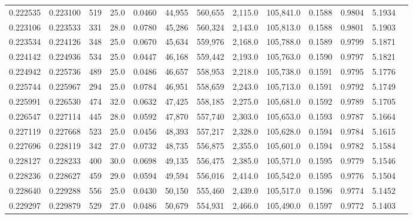 \begin{tabular}{rrrrrrrrrrrrr}
0.222535 & 0.223100 &   519 & 25.0 &                                     0.0460 &  44,955 & 560,655 &   2,115.0 & 105,841.0 & 0.1588 & 0.9804 & 5.1934 \\
0.223106 & 0.223533 &   331 & 28.0 &                                     0.0780 &  45,286 & 560,324 &   2,143.0 & 105,813.0 & 0.1588 & 0.9801 & 5.1903 \\
0.223534 & 0.224126 &   348 & 25.0 &                                     0.0670 &  45,634 & 559,976 &   2,168.0 & 105,788.0 & 0.1589 & 0.9799 & 5.1871 \\
0.224142 & 0.224936 &   534 & 25.0 &                                     0.0447 &  46,168 & 559,442 &   2,193.0 & 105,763.0 & 0.1590 & 0.9797 & 5.1821 \\
0.224942 & 0.225736 &   489 & 25.0 &                                     0.0486 &  46,657 & 558,953 &   2,218.0 & 105,738.0 & 0.1591 & 0.9795 & 5.1776 \\
0.225744 & 0.225967 &   294 & 25.0 &                                     0.0784 &  46,951 & 558,659 &   2,243.0 & 105,713.0 & 0.1591 & 0.9792 & 5.1749 \\
0.225991 & 0.226530 &   474 & 32.0 &                                     0.0632 &  47,425 & 558,185 &   2,275.0 & 105,681.0 & 0.1592 & 0.9789 & 5.1705 \\
0.226547 & 0.227114 &   445 & 28.0 &                                     0.0592 &  47,870 & 557,740 &   2,303.0 & 105,653.0 & 0.1593 & 0.9787 & 5.1664 \\
0.227119 & 0.227668 &   523 & 25.0 &                                     0.0456 &  48,393 & 557,217 &   2,328.0 & 105,628.0 & 0.1594 & 0.9784 & 5.1615 \\
0.227696 & 0.228119 &   342 & 27.0 &                                     0.0732 &  48,735 & 556,875 &   2,355.0 & 105,601.0 & 0.1594 & 0.9782 & 5.1584 \\
0.228127 & 0.228233 &   400 & 30.0 &                                     0.0698 &  49,135 & 556,475 &   2,385.0 & 105,571.0 & 0.1595 & 0.9779 & 5.1546 \\
0.228236 & 0.228627 &   459 & 29.0 &                                     0.0594 &  49,594 & 556,016 &   2,414.0 & 105,542.0 & 0.1595 & 0.9776 & 5.1504 \\
0.228640 & 0.229288 &   556 & 25.0 &                                     0.0430 &  50,150 & 555,460 &   2,439.0 & 105,517.0 & 0.1596 & 0.9774 & 5.1452 \\
0.229297 & 0.229879 &   529 & 27.0 &                                     0.0486 &  50,679 & 554,931 &   2,466.0 & 105,490.0 & 0.1597 & 0.9772 & 5.1403 \\

\end{tabular}
